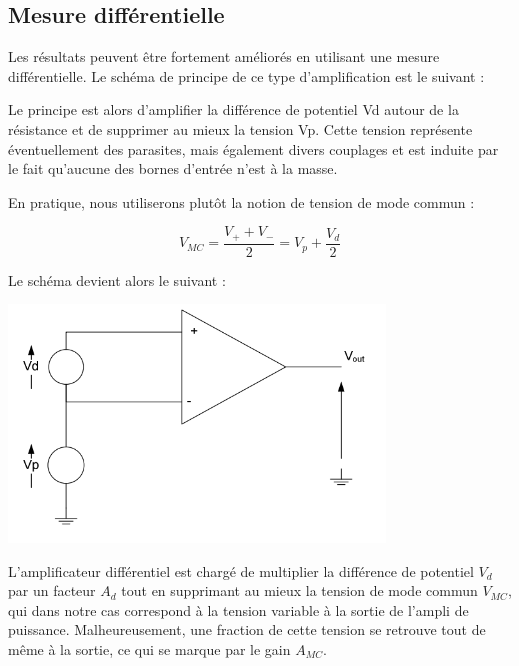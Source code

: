 \documentclass{../template/tp}
\begin{document}


\subsection{Mesure différentielle}

Les résultats peuvent être fortement améliorés en utilisant une mesure différentielle.
Le schéma de principe de ce type d'amplification est le suivant :


Le principe est alors d'amplifier la différence de potentiel Vd autour de la résistance et de supprimer
au mieux la tension Vp. Cette tension représente éventuellement des parasites, mais également divers
couplages et est induite par le fait qu'aucune des bornes d'entrée n'est à la masse.

En pratique, nous utiliserons plutôt la notion de tension de mode commun :

$$V_{MC}=\frac{V_+ + V_-}{2} = V_p + \frac{V_d}{2}$$

Le schéma devient alors le suivant :

\begin{center}
\includegraphics[width=10cm]{sch4}
\end{center}

L'amplificateur différentiel est chargé de multiplier la différence de potentiel $V_d$ par un facteur $A_d$ tout
en supprimant au mieux la tension de mode commun $V_{MC}$, qui dans notre cas correspond à la tension
variable à la sortie de l'ampli de puissance.
Malheureusement, une fraction de cette tension se retrouve tout de même à la sortie, ce qui se marque
par le gain $A_{MC}$.
\end{document}
